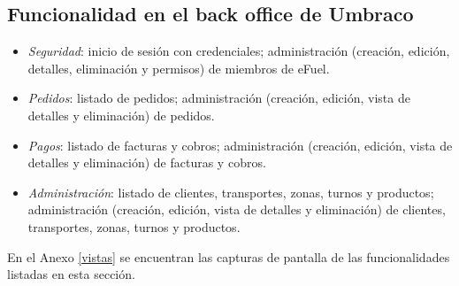 \subsection{Funcionalidad en el back office de Umbraco}
\begin{itemize}
    \item \emph{Seguridad}: inicio de sesión con credenciales; administración (creación, edición, detalles, eliminación y permisos) de miembros de eFuel.
    
    \item \emph{Pedidos}: listado de pedidos; administración (creación, edición, vista de detalles y eliminación) de pedidos.
    
    \item \emph{Pagos}: listado de facturas y cobros; administración (creación, edición, vista de detalles y eliminación) de facturas y cobros.
    
    \item \emph{Administración}: listado de clientes, transportes, zonas, turnos y productos; administración (creación, edición, vista de detalles y eliminación) de clientes, transportes, zonas, turnos y productos.
\end{itemize}

En el Anexo \ref{vistas} se encuentran las capturas de pantalla de las funcionalidades listadas en esta sección.
